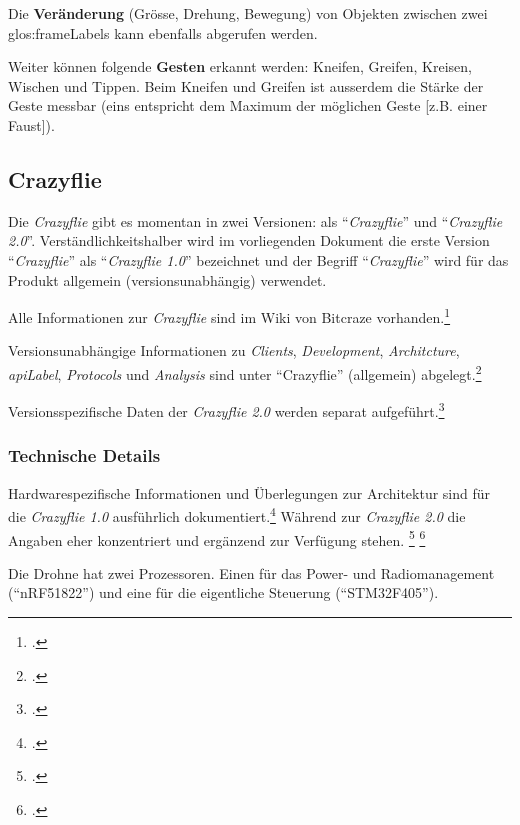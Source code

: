 Die \textbf{Veränderung} (Grösse, Drehung, Bewegung) von Objekten zwischen zwei \glspl{glos:frameLabel} kann ebenfalls abgerufen werden.

Weiter können folgende \textbf{Gesten} erkannt werden: Kneifen, Greifen, Kreisen, Wischen und Tippen.
Beim Kneifen und Greifen ist ausserdem die Stärke der Geste messbar (eins entspricht dem Maximum der möglichen Geste [z.B. einer Faust]).

\subsection{Crazyflie}
\label{subsec:isAnalyseDrone}
Die \textit{Crazyflie} gibt es momentan in zwei Versionen: als "`\textit{Crazyflie}"' und "`\textit{Crazyflie 2.0}"'. Verständlichkeitshalber wird im vorliegenden Dokument die erste Version "`\textit{Crazyflie}"' als "`\textit{Crazyflie 1.0}"' bezeichnet und der Begriff "`\textit{Crazyflie}"' wird für das Produkt allgemein (versionsunabhängig) verwendet.

Alle Informationen zur \textit{Crazyflie} sind im Wiki von Bitcraze vorhanden.\footcite{index_Bitcraze_Wiki_2015-03-29}

Versionsunabhängige Informationen zu  \textit{Clients}, \textit{Development}, \textit{Architcture}, \textit{\gls{apiLabel}}, \textit{Protocols} und \textit{Analysis} sind unter "`Crazyflie"' (allgemein) abgelegt.\footcite{doc_crazyflie_index_Bitcraze_Wiki_2015-03-29}

Versionsspezifische Daten der \textit{Crazyflie 2.0} werden separat aufgeführt.\footcite{projects_crazyflie2_index_Bitcraze_Wiki_2015-03-29}

\subsubsection{Technische Details}
Hardwarespezifische Informationen und Überlegungen zur Architektur sind für die \textit{Crazyflie 1.0} ausführlich dokumentiert.\footcite{projects_crazyflie_hardware_explained_Bitcraze_Wiki_2015-03-29}
Während zur \textit{Crazyflie 2.0} die Angaben eher konzentriert und ergänzend zur Verfügung stehen.
\footcite{projects_crazyflie2_architecture_index_Bitcraze_Wiki_2015-03-29}
\footcite{projects_crazyflie2_hardware_specification_Bitcraze_Wiki_2015-03-29}

Die Drohne hat zwei Prozessoren. Einen für das Power- und Radiomanagement ("`nRF51822"') und eine für die eigentliche Steuerung ("`STM32F405"').

